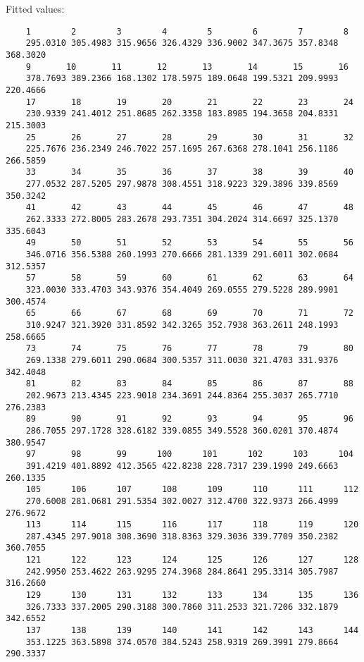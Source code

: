 \documentclass[12pt,letterpaper]{article}
\begin{document}
\begin{enumerate}
	Fitted values:
	\begin{verbatim}
	1        2        3        4        5        6        7        8 
	295.0310 305.4983 315.9656 326.4329 336.9002 347.3675 357.8348 368.3020 
	9       10       11       12       13       14       15       16 
	378.7693 389.2366 168.1302 178.5975 189.0648 199.5321 209.9993 220.4666 
	17       18       19       20       21       22       23       24 
	230.9339 241.4012 251.8685 262.3358 183.8985 194.3658 204.8331 215.3003 
	25       26       27       28       29       30       31       32 
	225.7676 236.2349 246.7022 257.1695 267.6368 278.1041 256.1186 266.5859 
	33       34       35       36       37       38       39       40 
	277.0532 287.5205 297.9878 308.4551 318.9223 329.3896 339.8569 350.3242 
	41       42       43       44       45       46       47       48 
	262.3333 272.8005 283.2678 293.7351 304.2024 314.6697 325.1370 335.6043 
	49       50       51       52       53       54       55       56 
	346.0716 356.5388 260.1993 270.6666 281.1339 291.6011 302.0684 312.5357 
	57       58       59       60       61       62       63       64 
	323.0030 333.4703 343.9376 354.4049 269.0555 279.5228 289.9901 300.4574 
	65       66       67       68       69       70       71       72 
	310.9247 321.3920 331.8592 342.3265 352.7938 363.2611 248.1993 258.6665 
	73       74       75       76       77       78       79       80 
	269.1338 279.6011 290.0684 300.5357 311.0030 321.4703 331.9376 342.4048 
	81       82       83       84       85       86       87       88 
	202.9673 213.4345 223.9018 234.3691 244.8364 255.3037 265.7710 276.2383 
	89       90       91       92       93       94       95       96 
	286.7055 297.1728 328.6182 339.0855 349.5528 360.0201 370.4874 380.9547 
	97       98       99      100      101      102      103      104 
	391.4219 401.8892 412.3565 422.8238 228.7317 239.1990 249.6663 260.1335 
	105      106      107      108      109      110      111      112 
	270.6008 281.0681 291.5354 302.0027 312.4700 322.9373 266.4999 276.9672 
	113      114      115      116      117      118      119      120 
	287.4345 297.9018 308.3690 318.8363 329.3036 339.7709 350.2382 360.7055 
	121      122      123      124      125      126      127      128 
	242.9950 253.4622 263.9295 274.3968 284.8641 295.3314 305.7987 316.2660 
	129      130      131      132      133      134      135      136 
	326.7333 337.2005 290.3188 300.7860 311.2533 321.7206 332.1879 342.6552 
	137      138      139      140      141      142      143      144 
	353.1225 363.5898 374.0570 384.5243 258.9319 269.3991 279.8664 290.3337 

\end{verbatim}
\end{enumerate}
\end{document}
